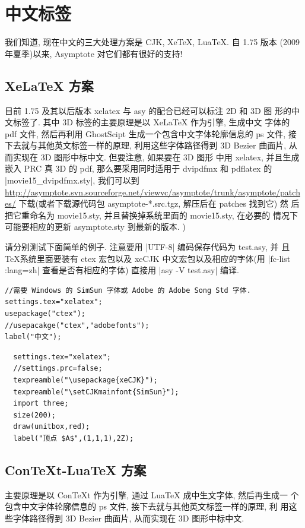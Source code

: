 \documentclass[nofonts,CJKnormalspaces]{ctexbook}[2009/05/20]
\begin{document}
\section{中文标签}
我们知道, 现在中文的三大处理方案是 CJK, XeTeX, LuaTeX. 自 1.75 版本
(2009 年夏季)以来, Asymptote 对它们都有很好的支持!

\subsection{XeLaTeX 方案}
目前 1.75 及其以后版本 xelatex 与 asy 的配合已经可以标注 2D 和 3D 图
形的中文标签了. 其中 3D 标签的主要原理是以 XeLaTeX 作为引擎, 生成中文
字体的 pdf 文件, 然后再利用 GhostScipt 生成一个包含中文字体轮廓信息的
ps 文件, 接下去就与其他英文标签一样的原理, 利用这些字体路径得到 3D
Bezier 曲面片, 从而实现在 3D 图形中标中文.  但要注意, 如果要在 3D 图形
中用 xelatex, 并且生成嵌入 PRC 真 3D 的 pdf, 那么要采用同时适用于
dvipdfmx 和 pdflatex 的 |movie15_dvipdfmx.sty|, 我们可以到
\url{http://asymptote.svn.sourceforge.net/viewvc/asymptote/trunk/asymptote/patches/}
下载(或者下载源代码包 asymptote-*.src.tgz, 解压后在 patches 找到它) 然
后把它重命名为 movie15.sty, 并且替换掉系统里面的 movie15.sty, 在必要的
情况下可能要相应的更新 asymptote.sty 到最新的版本.
\label{movie15:xelatex})

请分别测试下面简单的例子. 注意要用 |UTF-8| 编码保存代码为 test.asy, 并
且 \TeX 系统里面要装有 ctex 宏包以及 xeCJK 中文宏包以及相应的字体(用
|fc-list :lang=zh| 查看是否有相应的字体) 直接用
|asy -V test.asy| 编译.

\begin{lstlisting}
//需要 Windows 的 SimSun 字体或 Adobe 的 Adobe Song Std 字体.
settings.tex="xelatex";
usepackage("ctex");
//usepacakge("ctex","adobefonts");
label("中文");
\end{lstlisting}

\begin{lstlisting}
  settings.tex="xelatex";
  //settings.prc=false;
  texpreamble("\usepackage{xeCJK}");
  texpreamble("\setCJKmainfont{SimSun}");
  import three;
  size(200);
  draw(unitbox,red);
  label("顶点 $A$",(1,1,1),2Z);
\end{lstlisting}


\subsection{ConTeXt-LuaTeX 方案}
主要原理是以 ConTeXt 作为引擎, 通过 LuaTeX 成中生文字体, 然后再生成一
个包含中文字体轮廓信息的 ps 文件, 接下去就与其他英文标签一样的原理, 利
用这些字体路径得到 3D Bezier 曲面片, 从而实现在 3D 图形中标中文.
\end{document}
